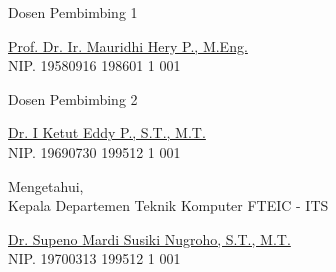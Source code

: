 \begin{center}

  \begin{multicols}{2}

    Dosen Pembimbing 1
    \vspace{12ex}

    \underline{Prof. Dr. Ir. Mauridhi Hery P., M.Eng.} \\
    NIP. 19580916 198601 1 001

    \columnbreak

    Dosen Pembimbing 2
    \vspace{12ex}

    \underline{Dr. I Ketut Eddy P., S.T., M.T.} \\
    NIP. 19690730 199512 1 001

  \end{multicols}
  \vspace{6ex}

  Mengetahui, \\
  Kepala Departemen Teknik Komputer FTEIC - ITS
  \vspace{12ex}

  \underline{Dr. Supeno Mardi Susiki Nugroho, S.T., M.T.} \\
  NIP. 19700313 199512 1 001

\end{center}
